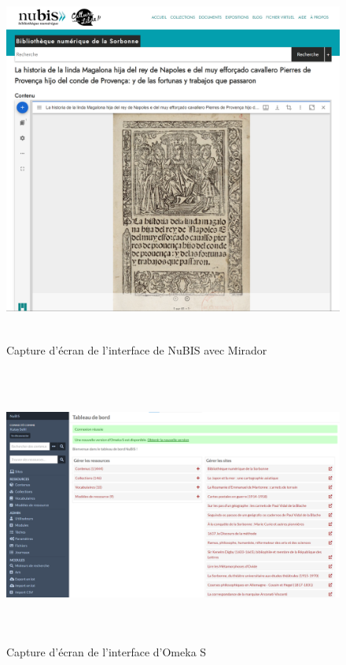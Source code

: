 \documentclass[a4paper,12pt,twoside]{book}
\begin{document}
\begin{figure} [H]
	\centering
	\includegraphics[width=5.23681in,height=4.77569in]{vertopal_157ae480aa4a4b07be198b586a812241/media/image1.png}
	\caption{Capture d'écran de l'interface de NuBIS avec Mirador}
\end{figure}

\begin{figure} [H]
	\centering
	\includegraphics[width=6.4in,height=3.6in]{vertopal_157ae480aa4a4b07be198b586a812241/media/image26.png}
	\caption{Capture d'écran de l'interface d'Omeka S}
\end{figure}
\end{document}

